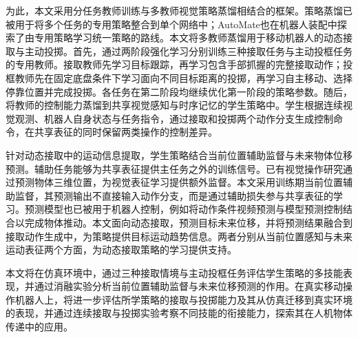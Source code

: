 为此，本文采用分任务教师训练与多教师视觉策略蒸馏相结合的框架。策略蒸馏已被用于将多个任务的专用策略整合到单个网络中\cite{rusu2015distillation}；AutoMate也在机器人装配中探索了由专用策略学习统一策略的路线\cite{tang2024automate}。本文将多教师蒸馏用于移动机器人的动态接取与主动投掷。首先，通过两阶段强化学习分别训练三种接取任务与主动投框任务的专用教师。接取教师先学习目标跟踪，再学习包含手部抓握的完整接取动作；投框教师先在固定底盘条件下学习面向不同目标距离的投掷，再学习自主移动、选择停靠位置并完成投掷。各任务在第二阶段均继续优化第一阶段的策略参数。随后，将教师的控制能力蒸馏到共享视觉感知与时序记忆的学生策略中。学生根据连续视觉观测、机器人自身状态与任务指令，通过接取和投掷两个动作分支生成控制命令，在共享表征的同时保留两类操作的控制差异。

针对动态接取中的运动信息提取，学生策略结合当前位置辅助监督与未来物体位移预测。辅助任务能够为共享表征提供主任务之外的训练信号\cite{jaderberg2017auxiliary}。已有视觉操作研究通过预测物体三维位置，为视觉表征学习提供额外监督\cite{zhu2018visuomotor}。本文采用训练期当前位置辅助监督，其预测输出不直接输入动作分支，而是通过辅助损失参与共享表征的学习。预测模型也已被用于机器人控制，例如将动作条件视频预测与模型预测控制结合以完成物体推动\cite{finn2017foresight}。本文面向动态接取，预测目标未来位移，并将预测结果融合到接取动作生成中，为策略提供目标运动趋势信息。两者分别从当前位置感知与未来运动表征两个方面，为动态接取策略的学习提供支持。

本文将在仿真环境中，通过三种接取情境与主动投框任务评估学生策略的多技能表现，并通过消融实验分析当前位置辅助监督与未来位移预测的作用。在真实移动操作机器人上，将进一步评估所学策略的接取与投掷能力及其从仿真迁移到真实环境的表现，并通过连续接取与投掷实验考察不同技能的衔接能力，探索其在人机物体传递中的应用。

